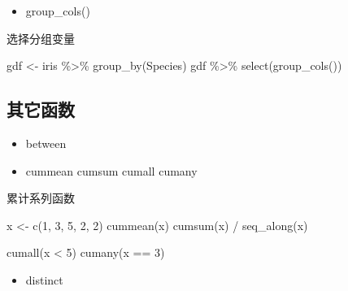 \documentclass[
]{book}
\newenvironment{Shaded}{\begin{snugshade}}{\end{snugshade}}
\newcommand{\DecValTok}[1]{\textcolor[rgb]{0.00,0.00,0.81}{#1}}
\newcommand{\FunctionTok}[1]{\textcolor[rgb]{0.00,0.00,0.00}{#1}}
\newcommand{\NormalTok}[1]{#1}
\newcommand{\OtherTok}[1]{\textcolor[rgb]{0.56,0.35,0.01}{#1}}
\newcommand{\SpecialCharTok}[1]{\textcolor[rgb]{0.00,0.00,0.00}{#1}}
\providecommand{\tightlist}{%
  \setlength{\itemsep}{0pt}\setlength{\parskip}{0pt}}
\begin{document}
\begin{itemize}
\tightlist
\item
  group\_cols()
\end{itemize}

选择分组变量

\begin{Shaded}
\begin{Highlighting}[]
\NormalTok{gdf }\OtherTok{\textless{}{-}}\NormalTok{ iris }\SpecialCharTok{\%\textgreater{}\%} \FunctionTok{group\_by}\NormalTok{(Species)}
\NormalTok{gdf }\SpecialCharTok{\%\textgreater{}\%} \FunctionTok{select}\NormalTok{(}\FunctionTok{group\_cols}\NormalTok{())}
\end{Highlighting}
\end{Shaded}

\hypertarget{ux5176ux5b83ux51fdux6570}{%
\subsection{其它函数}\label{ux5176ux5b83ux51fdux6570}}

\begin{itemize}
\item
  between
\item
  cummean cumsum cumall cumany
\end{itemize}

累计系列函数

\begin{Shaded}
\begin{Highlighting}[]
\NormalTok{x }\OtherTok{\textless{}{-}} \FunctionTok{c}\NormalTok{(}\DecValTok{1}\NormalTok{, }\DecValTok{3}\NormalTok{, }\DecValTok{5}\NormalTok{, }\DecValTok{2}\NormalTok{, }\DecValTok{2}\NormalTok{)}
\FunctionTok{cummean}\NormalTok{(x)}
\FunctionTok{cumsum}\NormalTok{(x) }\SpecialCharTok{/} \FunctionTok{seq\_along}\NormalTok{(x)}

\FunctionTok{cumall}\NormalTok{(x }\SpecialCharTok{\textless{}} \DecValTok{5}\NormalTok{)}
\FunctionTok{cumany}\NormalTok{(x }\SpecialCharTok{==} \DecValTok{3}\NormalTok{)}
\end{Highlighting}
\end{Shaded}

\begin{itemize}
\tightlist
\item
  distinct
\end{itemize}
\end{document}
